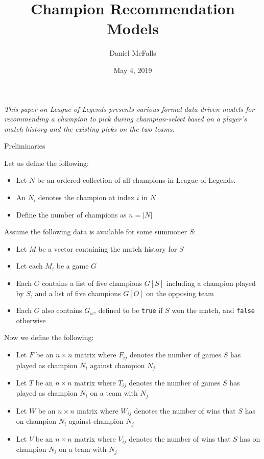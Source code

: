 \documentclass[12pt,letterpaper]{article}
\title{Champion Recommendation Models}
\author{Daniel McFalls}
\date{May 4, 2019}
\begin{document}
\thispagestyle{fancy} %

\maketitle

\textit{This paper on League of Legends presents various formal data-driven
models for recommending a champion to pick during champion-select based on a
player's match history and the existing picks on the two teams.}

\begin{section}{Preliminaries}

Let us define the following:

\begin{itemize}
    \item Let $N$ be an ordered collection of all champions in League of
    Legends.
    \item An $N_i$ denotes the champion at index $i$ in $N$
    \item Define the number of champions as $n=|N|$
\end{itemize}

Assume the following data is available for some summoner $S$:

\begin{itemize}
    \item Let $M$ be a vector containing the match history for $S$
    \item Let each $M_i$ be a game $G$
    \item Each $G$ contains a list of five champions $G[S]$ including a champion
    played by $S$, and a list of five champions $G[O]$ on the opposing team
    \item Each $G$ also contains $G_w$, defined to be \verb|true| if $S$ won the
    match, and \verb|false| otherwise
\end{itemize}

Now we define the following:

\begin{itemize}
    \item Let $F$ be an $n \times n$ matrix where $F_{ij}$ denotes the number of
    games $S$ has played as champion $N_i$ against champion $N_j$
    \item Let $T$ be an $n \times n$ matrix where $T_{ij}$ denotes the number of
    games $S$ has played as champion $N_i$ on a team with $N_j$
    \item Let $W$ be an $n \times n$ matrix where $W_{ij}$ denotes the number of
    wins that $S$ has on champion $N_i$ against champion $N_j$
    \item Let $V$ be an $n \times n$ matrix where $V_{ij}$ denotes the number of
    wins that $S$ has on champion $N_i$ on a team with $N_j$
\end{itemize}

\end{section}
\end{document}
